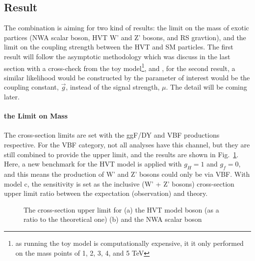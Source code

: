 \subsection{Result}
The combination is aiming for two kind of results: the limit on the mass of exotic partices (NWA scalar boson, HVT W' and Z' bosons, and RS gravtion), and the limit on the coupling strength between the HVT and SM particles. The first result will follow the asymptotic methodology which was discuss in the last section with a cross-check from the toy model\footnote{as running the toy model is computationally expensive, it it only performed on the mass points of 1, 2, 3, 4, and 5 TeV}, and , for the second result, a similar likelihood would be constructed by the parameter of interest would be the coupling constant, $\vec{g}$, instead of the signal strength, $\mu$. The detail will be coming later. 
\\
\\{\bf the Limit on Mass}
\\
\\The cross-section limits are set with the ggF/DY and VBF productions respective. For the VBF category, not all analyses have this channel, but they are still combined to provide the upper limit, and the results are shown in Fig.~\ref{Fig:limit_VBF_comb}. Here, a new benchmark for the HVT model is applied with $g_{H}=1$ and $g_{f}=0$, and this means the production of W' and Z' bosons could only be via VBF. With model c, the sensitivity is set as the inclusive (W' + Z' bosons) cross-section upper limit ratio between the expectation (observation) and theory.  
\begin{figure}[ht]
	\centering
	\caption{The cross-section upper limit for (a) the HVT model boson (as a ratio to the theoretical one) (b) and the NWA scalar boson }
	\label{Fig:limit_VBF_comb}
\end{figure}

